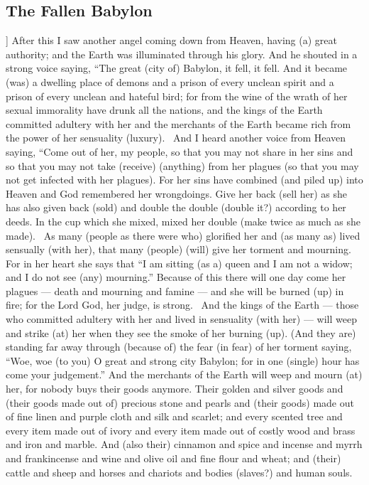 \begin{pages}
\begin{Leftside}
        			\chapter{The Fallen Babylon}
				]		
		After this I saw another angel coming down from Heaven, having (a) great authority; and the Earth was illuminated through his glory. And he shouted in a strong voice saying, “The great (city of) Babylon, it fell, it fell. And it became (was) a dwelling place of demons and a prison of every unclean spirit and a prison of every unclean and hateful bird; for from the wine of the wrath of her sexual immorality have drunk all the nations, and the kings of the Earth committed adultery with her and the merchants of the Earth became rich from the power of her sensuality (luxury). 
		\pend
		\pstart
		And I heard another voice from Heaven saying, “Come out of her, my people, so that you may not share in her sins and so that you may not take (receive) (anything) from her plagues (so that you may not get infected with her plagues). For her sins have combined (and piled up) into Heaven and God remembered her wrongdoings. Give her back (sell her) as she has also given back (sold) and double the double (double it?) according to her deeds. In the cup which she mixed, mixed her double (make twice as much as she made). 
		\pend
		\pstart
		As many (people as there were who) glorified her and (as many as) lived sensually (with her), that many (people) (will) give her torment and mourning. For in her heart she says that “I am sitting (as a) queen and I am not a widow; and I do not see (any) mourning.” Because of this there will one day come her plagues — death and mourning and famine — and she will be burned (up) in fire; for the Lord God, her judge, is strong. 
		\pend
		\pstart
		And the kings of the Earth — those who committed adultery with her and lived in sensuality (with her) — will weep and strike (at) her when they see the smoke of her burning (up). (And they are) standing far away through (because of) the fear (in fear) of her torment saying, “Woe, woe (to you) O great and strong city Babylon; for in one (single) hour has come your judgement.”
		\pend
		\pstart
		And the merchants of the Earth will weep and mourn (at) her, for nobody buys their goods anymore. Their golden and silver goods and (their goods made out of) precious stone and pearls and (their goods) made out of fine linen and purple cloth and silk and scarlet; and every scented tree and every item made out of ivory and every item made out of costly wood and brass and iron and marble. And (also their) cinnamon and spice and incense and myrrh and frankincense and wine and olive oil and fine flour and wheat; and (their) cattle and sheep and horses and chariots and bodies (slaves?) and human souls. 

\end{Leftside}
\end{pages}
